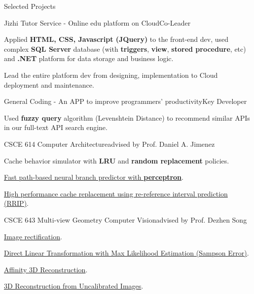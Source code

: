 \documentclass{resume} %
\begin{document}
\begin{rSection}{Selected Projects}

\begin{rSubsection}{Jizhi Tutor Service - Online edu platform on Cloud}{Co-Leader}{}{}
\item Applied \textbf{HTML, CSS, Javascript (JQuery)} to the front-end dev, used complex \textbf{SQL Server} database (with \textbf{triggers}, \textbf{view}, \textbf{stored procedure}, etc) and \textbf{.NET} platform for data storage and business logic.
\item Lead the entire platform dev from designing, implementation to Cloud deployment and maintenance.
\end{rSubsection}


\begin{rSubsection}{General Coding - An APP to improve programmers' productivity}{Key Developer}{}{}
\item Used \textbf{fuzzy query} algorithm (Levenshtein Distance) to recommend similar APIs in our full-text API search engine.
\end{rSubsection}

\begin{rSubsection}{CSCE 614 Computer Architecture}{advised by Prof. Daniel A. Jimenez}{}{}
\item Cache behavior simulator with \textbf{LRU} and \textbf{random replacement} policies.
\item \href{https://github.com/vincenttsang/CompArch/blob/master/branch-predictor/p1-final-report/p1-final-report.pdf}{Fast path-based neural branch predictor with \textbf{perceptron}}.
\item \href{https://github.com/vincenttsang/CompArch/blob/master/cache-replacer/p2-final-report/p2-final-report.pdf}{High performance cache replacement using re-reference interval prediction (RRIP)}.
\end{rSubsection}

\begin{rSubsection}{CSCE 643 Multi-view Geometry Computer Vision}{advised by Prof. Dezhen Song}{}{}
\item \href{https://github.com/ykzeng/multiview-geo-cv/blob/master/docs/hw-1/bare_conf.pdf}{Image rectification}.
\item \href{https://github.com/ykzeng/multiview-geo-cv/blob/master/docs/hw-2/bare_conf.pdf}{Direct Linear Transformation with Max Likelihood Estimation (Sampson Error)}.
\item \href{https://github.com/ykzeng/multiview-geo-cv/blob/master/docs/hw-5/bare_conf.pdf}{Affinity 3D Reconstruction}.
\item \href{https://github.com/ykzeng/multiview-geo-cv/blob/master/docs/final-proj/proposal/bare_conf.pdf}{3D Reconstruction from Uncalibrated Images}.
\end{rSubsection}



\end{rSection}
\end{document}
